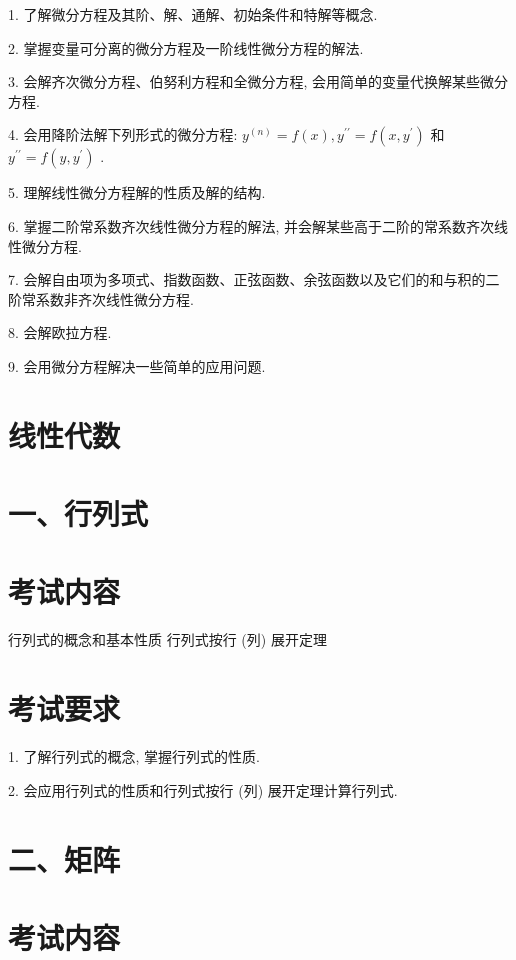 \documentclass[10pt]{article}
\begin{document}
1. 了解微分方程及其阶、解、通解、初始条件和特解等概念.

2. 掌握变量可分离的微分方程及一阶线性微分方程的解法.

3. 会解齐次微分方程、伯努利方程和全微分方程, 会用简单的变量代换解某些微分方程.

4. 会用降阶法解下列形式的微分方程: \({y}^{\left( n\right) } = f\left( x\right) ,{y}^{\prime \prime } = f\left( {x,{y}^{\prime }}\right)\) 和 \({y}^{\prime \prime } = f\left( {y,{y}^{\prime }}\right)\) .

5. 理解线性微分方程解的性质及解的结构.

6. 掌握二阶常系数齐次线性微分方程的解法, 并会解某些高于二阶的常系数齐次线性微分方程.

7. 会解自由项为多项式、指数函数、正弦函数、余弦函数以及它们的和与积的二阶常系数非齐次线性微分方程.

8. 会解欧拉方程.

9. 会用微分方程解决一些简单的应用问题.

\section*{线性代数}

\section*{一、行列式}

\section*{考试内容}

行列式的概念和基本性质 行列式按行 (列) 展开定理

\section*{考试要求}

1. 了解行列式的概念, 掌握行列式的性质.

2. 会应用行列式的性质和行列式按行 (列) 展开定理计算行列式.

\section*{二、矩阵}

\section*{考试内容}
\end{document}
